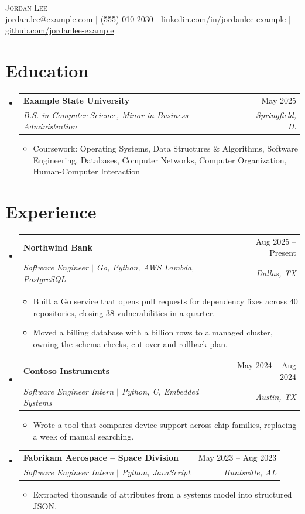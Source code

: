 \documentclass[letterpaper,11pt]{article}
\makeatletter
\newcommand{\entry}[4]{
  \item
  \begin{tabular*}{0.97\textwidth}[t]{l@{\extracolsep{\fill}}r}
    \textbf{#1} & #2 \\
    \textit{\small#3} & \textit{\small #4} \\
  \end{tabular*}\vspace{-7pt}
}
\newenvironment{entries}{\begin{itemize}[leftmargin=0.15in, label={}]}{\end{itemize}}
\newenvironment{points}{\begin{itemize}[leftmargin=0.2in]}{\end{itemize}\vspace{-5pt}}
\makeatother
\begin{document}
\begin{center}
  {\Huge \scshape Jordan Lee} \\ \vspace{1pt}
  \small \href{mailto:jordan.lee@example.com}{jordan.lee@example.com} $|$ (555) 010-2030 $|$
  \href{https://www.linkedin.com/in/jordanlee-example}{linkedin.com/in/jordanlee-example} $|$
  \href{https://github.com/jordanlee-example}{github.com/jordanlee-example}
\end{center}

\section{Education}
\begin{entries}
  \entry{Example State University}{May 2025}{B.S. in Computer Science, Minor in Business Administration}{Springfield, IL}
  \begin{points}
    \item Coursework: Operating Systems, Data Structures \& Algorithms, Software Engineering, Databases, Computer Networks, Computer Organization, Human-Computer Interaction
  \end{points}
\end{entries}

\section{Experience}
\begin{entries}
  \entry{Northwind Bank}{Aug 2025 -- Present}{Software Engineer $|$ Go, Python, AWS Lambda, PostgreSQL}{Dallas, TX}
  \begin{points}
    \item Built a Go service that opens pull requests for dependency fixes across 40 repositories, closing 38 vulnerabilities in a quarter.
    \item Moved a billing database with a billion rows to a managed cluster, owning the schema checks, cut-over and rollback plan.
  \end{points}
  \entry{Contoso Instruments}{May 2024 -- Aug 2024}{Software Engineer Intern $|$ Python, C, Embedded Systems}{Austin, TX}
  \begin{points}
    \item Wrote a tool that compares device support across chip families, replacing a week of manual searching.
  \end{points}
  \entry{Fabrikam Aerospace -- Space Division}{May 2023 -- Aug 2023}{Software Engineer Intern $|$ Python, JavaScript}{Huntsville, AL}
  \begin{points}
    \item Extracted thousands of attributes from a systems model into structured JSON.
  \end{points}
\end{entries}
\end{document}
